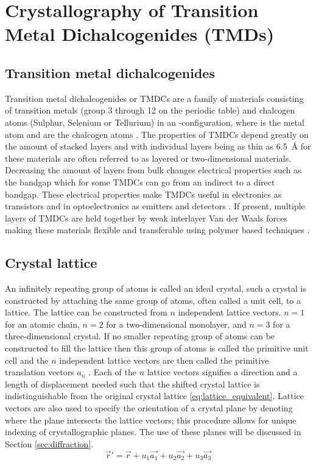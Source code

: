 \section{Crystallography of Transition Metal Dichalcogenides (TMDs)}
\subsection{Transition metal dichalcogenides}
Transition metal dichalcogenides or TMDCs are a family of materials consisting of transition metals (group 3 through 12 on the periodic table) and chalcogen atoms (Sulphur, Selenium or Tellurium) in an -configuration, where  is the metal atom and  are the chalcogen atoms \cite{C7TA04268J}.
The properties of TMDCs depend greatly on the amount of stacked layers and with individual layers being as thin as \SI{6.5}{\angstrom} for  these materials are often referred to as layered or two-dimensional materials.
Decreasing the amount of layers from bulk changes electrical properties such as the bandgap which for some TMDCs can go from an indirect to a direct bandgap.
These electrical properties make TMDCs useful in electronics as transistors and in optoelectronics as emitters and detectors \cite{emerg_photolum, LopezSanchez2013, Radisavljevic2011}. 
If present, multiple layers of TMDCs are held together by weak interlayer Van der Waals forces making these materials flexible and transferable using polymer based techniques \cite{reganEmergingExcitonPhysics2022a}.

\subsection{Crystal lattice}
An infinitely repeating group of atoms is called an ideal crystal, such a crystal is constructed by attaching the same group of atoms, often called a unit cell, to a lattice.
The lattice can be constructed from $n$ independent lattice vectors. $n=1$ for an atomic chain, $n=2$ for a two-dimensional monolayer, and $n=3$ for a three-dimensional crystal.
If no smaller repeating group of atoms can be constructed to fill the lattice then this group of atoms is called the primitive unit cell and the $n$ independent lattice vectors are then called the primitive translation vectors $a_{n}$ \cite{Kittel1995-qt}.
Each of the $n$ lattice vectors signifies a direction and a length of displacement needed such that the shifted crystal lattice is indistinguishable from the original crystal lattice \ref{eq:lattice_equivalent}.
Lattice vectors are also used to specify the orientation of a crystal plane by denoting where the plane intersects the lattice vectors; this procedure allows for unique indexing of crystallographic planes. The use of these planes will be discussed in Section \ref{sec:diffraction}.
\begin{equation}
    \vec{r}' = \vec{r} + u_1 \vec{a_1} +u_2 \vec{a_2} + u_3 \vec{a_3}
    \label{eq:lattice_equivalent}
\end{equation}

